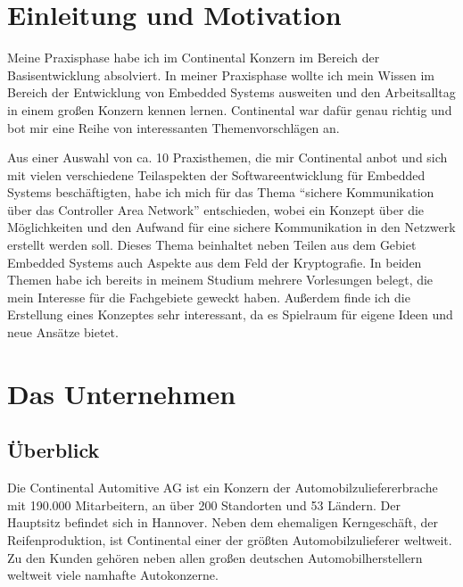 \section{Einleitung und Motivation}
Meine Praxisphase habe ich im Continental Konzern im Bereich der Basisentwicklung absolviert. 
In meiner Praxisphase wollte ich mein Wissen im Bereich der Entwicklung von Embedded Systems ausweiten und den Arbeitsalltag in einem großen Konzern kennen lernen. Continental war dafür genau richtig und bot mir eine Reihe von interessanten Themenvorschlägen an. 

Aus einer Auswahl von ca. 10 Praxisthemen, die mir Continental anbot und sich mit vielen verschiedene Teilaspekten der Softwareentwicklung für Embedded Systems beschäftigten, habe ich mich für das Thema "`sichere Kommunikation über das Controller Area Network"' entschieden, wobei ein Konzept über die Möglichkeiten und den Aufwand für eine sichere Kommunikation in den Netzwerk erstellt werden soll.
Dieses Thema beinhaltet neben Teilen aus dem Gebiet Embedded Systems auch Aspekte aus dem Feld der Kryptografie. In beiden Themen habe ich bereits in meinem Studium mehrere Vorlesungen belegt, die mein Interesse für die Fachgebiete geweckt haben. 
Außerdem finde ich die Erstellung eines Konzeptes sehr interessant, da es Spielraum für eigene Ideen und neue Ansätze bietet. 

\section{Das Unternehmen}
\subsection{Überblick}


Die Continental Automitive AG ist ein Konzern der Automobilzuliefererbrache mit 190.000 Mitarbeitern, an über 200 Standorten und 53 Ländern. Der Hauptsitz befindet sich in Hannover. Neben dem ehemaligen Kerngeschäft, der Reifenproduktion, ist Continental einer der größten Automobilzulieferer weltweit. Zu den Kunden gehören neben allen großen deutschen Automobilherstellern weltweit viele namhafte Autokonzerne.


